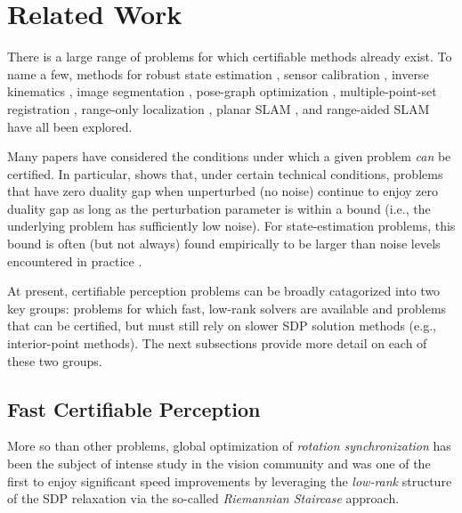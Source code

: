 \documentclass[lettersize,journal]{IEEEtran}
\begin{document}
\section{Related Work}

There is a large range of problems for which certifiable methods already exist. To name a few, methods for robust state estimation \cite{yangCertifiablyOptimalOutlierRobust2023,yangTEASERFastCertifiable2021}, sensor calibration \cite{wiseCertifiablyOptimalMonocular2020,giamouConvexIterationDistanceGeometric2022}, inverse kinematics \cite{giamouConvexIterationDistanceGeometric2022}, image segmentation \cite{huAcceleratedInferenceMarkov2019}, pose-graph optimization \cite{rosenSESyncCertifiablyCorrect2019}, multiple-point-set registration \cite{chaudhuryGlobalRegistrationMultiple2015, iglesiasGlobalOptimalityPoint2020}, range-only localization \cite{dumbgenSafeSmoothCertified2023}, planar SLAM \cite{liuConvexOptimizationBased2012}, and range-aided SLAM \cite{papaliaCertifiablyCorrectRangeAided2023} have all been explored. 

Many papers have considered the conditions under which a given problem \emph{can} be certified. In particular, \cite{cifuentesLocalStabilitySemidefinite2022} shows that, under certain technical conditions, problems that have zero duality gap when unperturbed (no noise) continue to enjoy zero duality gap as long as the perturbation parameter is within a bound (i.e., the underlying problem has sufficiently low noise). For state-estimation problems, this bound is often (but not always) found empirically to be larger than noise levels encountered in practice \cite{rosenSESyncCertifiablyCorrect2019, tianDistributedCertifiablyCorrect2021, erikssonRotationAveragingStrong2018}.

At present, certifiable perception problems can be broadly catagorized into two key groups: problems for which fast, low-rank solvers are available and problems that can be certified, but must still rely on slower SDP solution methods (e.g., interior-point methods). The next subsections provide more detail on each of these two groups.

\subsection{Fast Certifiable Perception}\label{sec:FastPerception}

More so than other problems, global optimization of \emph{rotation synchronization} has been the subject of intense study in the vision community \cite{wilsonWhenRotationsAveraging2016, erikssonRotationAveragingStrong2018, brynteTightnessSemidefiniteRelaxations2022} and was one of the first to enjoy significant speed improvements by leveraging the \emph{low-rank} structure of the SDP relaxation via the so-called \emph{Riemannian Staircase} approach\cite{bandeiraTightnessMaximumLikelihood2017, boumalNonconvexBurerMonteiro2016}. 
\end{document}
